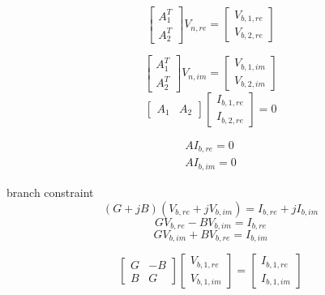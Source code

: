 \documentclass{book}
\begin{document}
\tableofcontents

\begin{equation}
\begin{bmatrix}
A_{1}^{T}\\
A_{2}^{T}
\end{bmatrix}
V_{n,re}
=
\begin{bmatrix}
V_{b,1,re}\\
V_{b,2,re}
\end{bmatrix}
\end{equation}

\begin{equation}
\begin{bmatrix}
A_{1}^{T}\\
A_{2}^{T}
\end{bmatrix}
V_{n,im}
=
\begin{bmatrix}
V_{b,1,im}\\
V_{b,2,im}
\end{bmatrix}
\end{equation}
\begin{equation}
\begin{bmatrix}
A_1&A_2
\end{bmatrix}
\begin{bmatrix}
I_{b,1,re}\\
I_{b,2,re}
\end{bmatrix}
=0
\end{equation}

\begin{equation}
\begin{aligned}
AI_{b,re}=0\\
AI_{b,im}=0
\end{aligned}
\end{equation}


branch constraint
\begin{equation}
(G+jB)(V_{b,re}+jV_{b,im})=I_{b,re}+jI_{b,im}
\end{equation}
\begin{equation}
GV_{b,re}-BV_{b,im}=I_{b,re}
\end{equation}
\begin{equation}
GV_{b,im}+BV_{b,re}=I_{b,im}
\end{equation}

\begin{equation}
\begin{bmatrix}
G&-B\\
B&G
\end{bmatrix}
\begin{bmatrix}
V_{b,1,re}\\
V_{b,1,im}
\end{bmatrix}
=
\begin{bmatrix}
I_{b,1,re}\\
I_{b,1,im}
\end{bmatrix}
\end{equation}
\end{document}
